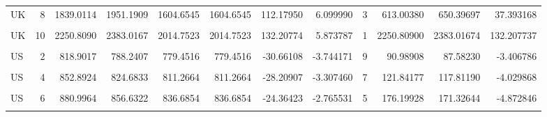 \begin{table}
\begin{tabular}{lrrrrrrrrrrr}
UK & 8 & 1839.0114 & 1951.1909 & 1604.6545 & 1604.6545 & 112.17950 & 6.099990 & 3 & 613.00380 & 650.39697 & 37.393168\\
\cellcolor{gray!10}{UK} & \cellcolor{gray!10}{9} & \cellcolor{gray!10}{2035.4076} & \cellcolor{gray!10}{2182.5672} & \cellcolor{gray!10}{1796.8807} & \cellcolor{gray!10}{1796.8807} & \cellcolor{gray!10}{147.15952} & \cellcolor{gray!10}{7.229978} & \cellcolor{gray!10}{2} & \cellcolor{gray!10}{1017.70382} & \cellcolor{gray!10}{1091.28358} & \cellcolor{gray!10}{73.579760}\\
UK & 10 & 2250.8090 & 2383.0167 & 2014.7523 & 2014.7523 & 132.20774 & 5.873787 & 1 & 2250.80900 & 2383.01674 & 132.207737\\
\addlinespace
\cellcolor{gray!10}{US} & \cellcolor{gray!10}{1} & \cellcolor{gray!10}{766.9808} & \cellcolor{gray!10}{738.7728} & \cellcolor{gray!10}{727.9712} & \cellcolor{gray!10}{727.9712} & \cellcolor{gray!10}{-28.20801} & \cellcolor{gray!10}{-3.677799} & \cellcolor{gray!10}{10} & \cellcolor{gray!10}{76.69808} & \cellcolor{gray!10}{73.87728} & \cellcolor{gray!10}{-2.820801}\\
US & 2 & 818.9017 & 788.2407 & 779.4516 & 779.4516 & -30.66108 & -3.744171 & 9 & 90.98908 & 87.58230 & -3.406786\\
\cellcolor{gray!10}{US} & \cellcolor{gray!10}{3} & \cellcolor{gray!10}{854.8408} & \cellcolor{gray!10}{826.0714} & \cellcolor{gray!10}{812.4877} & \cellcolor{gray!10}{812.4877} & \cellcolor{gray!10}{-28.76942} & \cellcolor{gray!10}{-3.365471} & \cellcolor{gray!10}{8} & \cellcolor{gray!10}{106.85510} & \cellcolor{gray!10}{103.25892} & \cellcolor{gray!10}{-3.596178}\\
US & 4 & 852.8924 & 824.6833 & 811.2664 & 811.2664 & -28.20907 & -3.307460 & 7 & 121.84177 & 117.81190 & -4.029868\\
\cellcolor{gray!10}{US} & \cellcolor{gray!10}{5} & \cellcolor{gray!10}{836.0756} & \cellcolor{gray!10}{814.1671} & \cellcolor{gray!10}{789.9692} & \cellcolor{gray!10}{789.9692} & \cellcolor{gray!10}{-21.90853} & \cellcolor{gray!10}{-2.620401} & \cellcolor{gray!10}{6} & \cellcolor{gray!10}{139.34593} & \cellcolor{gray!10}{135.69451} & \cellcolor{gray!10}{-3.651422}\\
\addlinespace
US & 6 & 880.9964 & 856.6322 & 836.6854 & 836.6854 & -24.36423 & -2.765531 & 5 & 176.19928 & 171.32644 & -4.872846\\
\cellcolor{gray!10}{US} & \cellcolor{gray!10}{7} & \cellcolor{gray!10}{917.7895} & \cellcolor{gray!10}{898.4618} & \cellcolor{gray!10}{873.1006} & \cellcolor{gray!10}{873.1006} & \cellcolor{gray!10}{-19.32770} & \cellcolor{gray!10}{-2.105897} & \cellcolor{gray!10}{4} & \cellcolor{gray!10}{229.44738} & \cellcolor{gray!10}{224.61546} & \cellcolor{gray!10}{-4.831926}\\

\end{tabular}
\end{table}
